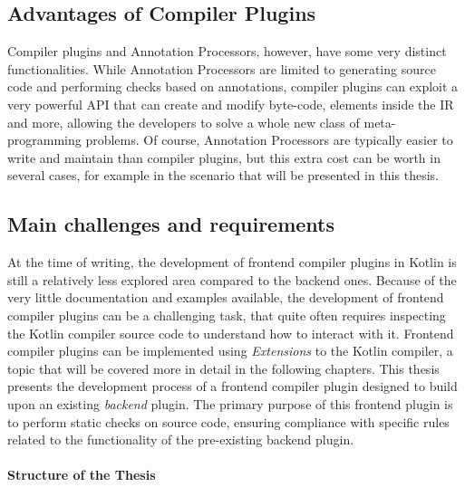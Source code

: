 \documentclass[12pt,a4paper,openright,twoside]{book}
\begin{document}
\subsection{Advantages of Compiler Plugins}

Compiler plugins and Annotation Processors, however, have some very distinct
functionalities. While Annotation Processors are limited to generating source
code and performing checks based on annotations, compiler plugins can exploit a
very powerful API that can create and modify byte-code, elements inside the
\ac{IR} and more, allowing the developers to solve a whole new class of
meta-programming problems. Of course, Annotation Processors are typically easier
to write and maintain than compiler plugins, but this extra cost can be worth in
several cases, for example in the scenario that will be presented in this
thesis.

\subsection{Main challenges and requirements}

At the time of writing, the development of frontend compiler plugins in Kotlin is
still a relatively less explored area compared to the backend ones. Because of the 
very little documentation and examples available, the development of frontend 
compiler plugins can be a challenging task, that quite often requires inspecting 
the Kotlin compiler source code to understand how to interact with it.
%
Frontend compiler plugins can be implemented using \textit{Extensions} to the
Kotlin compiler, a topic that will be covered more in detail in the following
chapters. This thesis presents the development process of a frontend compiler
plugin designed to build upon an existing \textit{backend} plugin. The primary
purpose of this frontend plugin is to perform static checks on source code,
ensuring compliance with specific rules related to the functionality of the
pre-existing backend plugin.


\paragraph{Structure of the Thesis}
\end{document}
